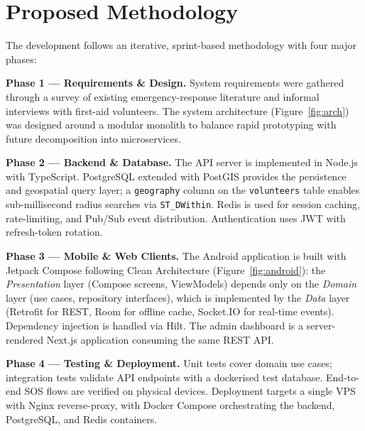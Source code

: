 \documentclass[12pt]{article}
\begin{document}
\section{Proposed Methodology}
The development follows an iterative, sprint-based methodology with four major phases:

\textbf{Phase 1 --- Requirements \& Design.}
System requirements were gathered through a survey of existing emergency-response literature and informal interviews with first-aid volunteers. The system architecture (Figure~\ref{fig:arch}) was designed around a modular monolith to balance rapid prototyping with future decomposition into microservices.

\textbf{Phase 2 --- Backend \& Database.}
The API server is implemented in Node.js with TypeScript. PostgreSQL extended with PostGIS provides the persistence and geospatial query layer; a \texttt{geography} column on the \texttt{volunteers} table enables sub-millisecond radius searches via \texttt{ST\_DWithin}. Redis is used for session caching, rate-limiting, and Pub/Sub event distribution. Authentication uses JWT with refresh-token rotation.

\textbf{Phase 3 --- Mobile \& Web Clients.}
The Android application is built with Jetpack Compose following Clean Architecture (Figure~\ref{fig:android}): the \emph{Presentation} layer (Compose screens, ViewModels) depends only on the \emph{Domain} layer (use cases, repository interfaces), which is implemented by the \emph{Data} layer (Retrofit for REST, Room for offline cache, Socket.IO for real-time events). Dependency injection is handled via Hilt. The admin dashboard is a server-rendered Next.js application consuming the same REST API.

\textbf{Phase 4 --- Testing \& Deployment.}
Unit tests cover domain use cases; integration tests validate API endpoints with a dockerised test database. End-to-end SOS flows are verified on physical devices. Deployment targets a single VPS with Nginx reverse-proxy, with Docker Compose orchestrating the backend, PostgreSQL, and Redis containers.

\end{document}
